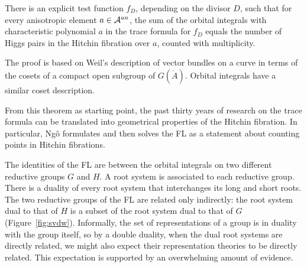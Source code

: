 \begin{thm}[Ng\^o] There is an explicit
  test function $f_D$, depending on the divisor $D$,
  such that for every anisotropic element $a\in\AA^{an}$, the
  sum of the orbital integrals with characteristic polynomial $a$  
  in the trace formula for $f_D$ 
  equals
  the number of Higgs pairs in the Hitchin fibration over $a$,
  counted with multiplicity.
\end{thm}

The proof is based on Weil's description of vector bundles on a curve
in terms of the cosets of a compact open subgroup of $G(\ring{A})$. 
Orbital integrals have a similar coset description.

From this theorem as starting point, the past thirty years of research
on the trace formula can be translated into geometrical properties of
the Hitchin fibration.  In particular, Ng\^o formulates and then solves
the FL as a statement about counting points in Hitchin
fibrations.  

The identities of the FL are between the orbital integrals on two
different reductive groups $G$ and $H$.  A root system is associated
to each reductive group.  There is a duality of every root system that
interchanges its long and short roots.  The two reductive
groups of the FL are related
only indirectly: the root system dual to that of $H$ is a subset of
the root system dual to that of $G$ (Figure~\ref{fig:svdw}).  Informally, the set
of representations of a group is in duality with the group itself, so
by a double duality, when the dual root systems are directly related,
we might also expect their representation theories to be directly
related.  This expectation is supported by an overwhelming amount
of evidence.

